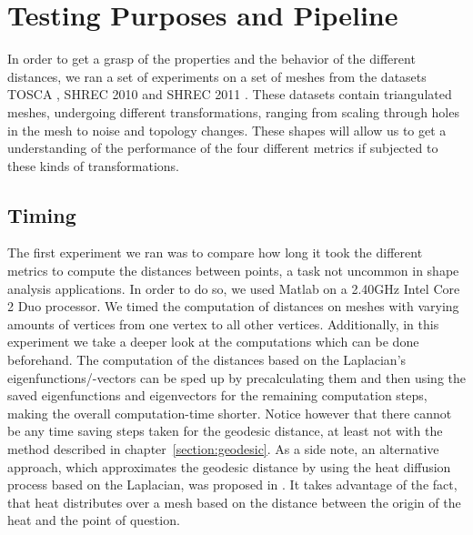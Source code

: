 \chapter{Testing Purposes and Pipeline}
\label{chapter:testing}


In order to get a grasp of the properties and the behavior of the different distances, we ran a set of experiments on a set of meshes from the datasets TOSCA \cite{bronstein2008numerical}, SHREC 2010 \cite{bronstein2010shrec} and SHREC 2011 \cite{dutagaci2011shrec}.
These datasets contain triangulated meshes, undergoing different transformations, ranging from scaling through holes in the mesh to noise and topology changes.
These shapes will allow us to get a understanding of the performance of the four different metrics if subjected to these kinds of transformations.

\section{Timing}

The first experiment we ran was to compare how long it took the different metrics to compute the distances between points, a task not uncommon in shape analysis applications.
In order to do so, we used Matlab on a 2.40GHz Intel Core 2 Duo processor.
We timed the computation of distances on meshes with varying amounts of vertices from one vertex to all other vertices.
Additionally, in this experiment we take a deeper look at the computations which can be done beforehand.
The computation of the distances based on the Laplacian's eigenfunctions/-vectors can be sped up by precalculating them and then using the saved eigenfunctions and eigenvectors for the remaining computation steps, making the overall computation-time shorter.
Notice however that there cannot be any time saving steps taken for the geodesic distance, at least not with the method described in chapter~\ref{section:geodesic}.
As a side note, an alternative approach, which approximates the geodesic distance by using the heat diffusion process based on the Laplacian, was proposed in \cite{crane2013geodesics}.
It takes advantage of the fact, that heat distributes over a mesh based on the distance between the origin of the heat and the point of question.

